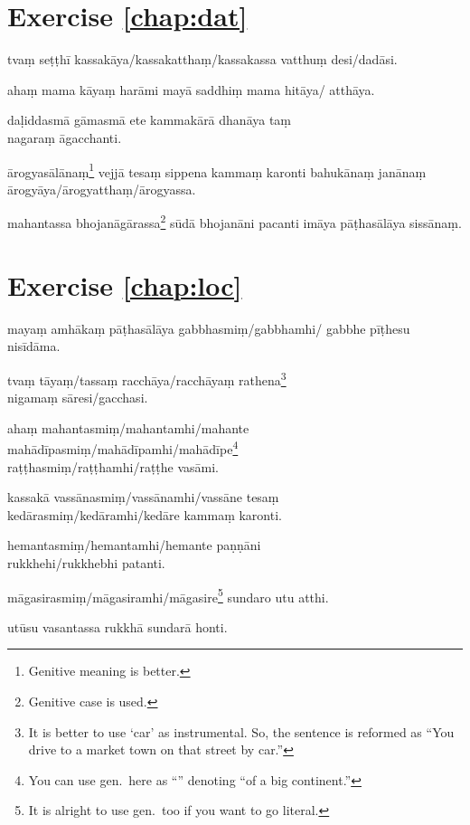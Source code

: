 \section*{Exercise \ref{chap:dat}}
\begin{answerkey}
\item tva\d m se\d t\d th\=i kassak\=aya/kassakattha\d m/kassakassa vatthu\d m desi/dad\=asi.
\item aha\d m mama k\=aya\d m har\=ami may\=a saddhi\d m mama hit\=aya/ atth\=aya.
\item da\d liddasm\=a g\=amasm\=a ete kammak\=ar\=a dhan\=aya ta\d m \\nagara\d m \=agacchanti.
\item \=arogyas\=al\=ana\d m\footnote{Genitive meaning is better.} vejj\=a tesa\d m sippena kamma\d m karonti bahu\-k\=ana\d m jan\=ana\d m \=arogy\=aya/\=arogyattha\d m/\=arogyassa.
\item mahantassa bhojan\=ag\=arassa\footnote{Genitive case is used.} s\=ud\=a bhojan\=ani pacanti im\=aya p\=a\d thas\=al\=aya siss\=ana\d m.
\end{answerkey}

\section*{Exercise \ref{chap:loc}}
\begin{answerkey}
\item maya\d m amh\=aka\d m p\=a\d thas\=al\=aya gabbhasmi\d m/gabbhamhi/ gabbhe p\=i\d thesu nis\=id\=ama.
\item tva\d m t\=aya\d m/tassa\d m racch\=aya/racch\=aya\d m rathena\footnote{It is better to use `car' as instrumental. So, the sentence is reformed as ``You drive to a market town on that street by car.''} \\nigama\d m s\=aresi/gacchasi.
\item aha\d m mahantasmi\d m/mahantamhi/mahante \\mah\=ad\=ipasmi\d m/mah\=ad\=ipamhi/mah\=ad\=ipe\footnote{You can use gen.\ here as ``'' denoting ``of a big continent.''}\\ra\d t\d thasmi\d m/ra\d t\d thamhi/ra\d t\d the vas\=ami.
\item kassak\=a vass\=anasmi\d m/vass\=anamhi/vass\=ane tesa\d m \\ked\=arasmi\d m/ked\=aramhi/ked\=are kamma\d m karonti.
\item hemantasmi\d m/hemantamhi/hemante pa\d n\d n\=ani \\rukkhehi/rukkhebhi patanti.
\item m\=agasirasmi\d m/m\=agasiramhi/m\=agasire\footnote{It is alright to use gen.\ too if you want to go literal.} sundaro utu atthi.
\item ut\=usu vasantassa rukkh\=a sundar\=a honti.
\end{answerkey}

